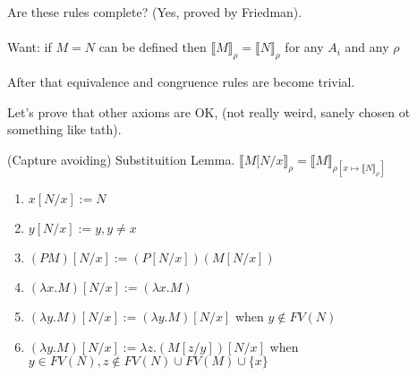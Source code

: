 \documentclass[a4paper,10pt]{book}
\newcommand{\sem}[2]{ \llbracket#1\rrbracket_{#2} }
\begin{document}
Are these rules complete? (Yes, proved by Friedman).

\paragraph{}
Want: if $M=N$ can be defined then $\sem{M}{\rho} = \llbracket N \rrbracket_\rho$ for any $A_i$  and any $\rho$

After that equivalence and congruence rules are become trivial.

Let's prove that other axioms are OK, (not really weird, sanely chosen ot something like tath).





(Capture avoiding) Substituition Lemma.
$\llbracket M[N/x\rrbracket_\rho = \llbracket M\rrbracket_{\rho
[x \mapsto \llbracket N\rrbracket_\rho]}$


\begin{enumerate}
\item $x[N/x] := N$
\item $y[N/x] := y, y \neq x$
\item $(PM)[N/x] := (P[N/x]) (M[N/x])$
\item $(\lambda x . M)[N/x] := (\lambda x . M)$
\item $(\lambda y . M)[N/x] := (\lambda y . M)[N/x]$ when $y \not\in FV(N)$
\item $(\lambda y . M)[N/x] := \lambda z . (M[z/y])[N/x]$ when $y \in FV(N), z \not\in FV(N) \cup FV(M) \cup \{x\}$
\end{enumerate}
\end{document}
